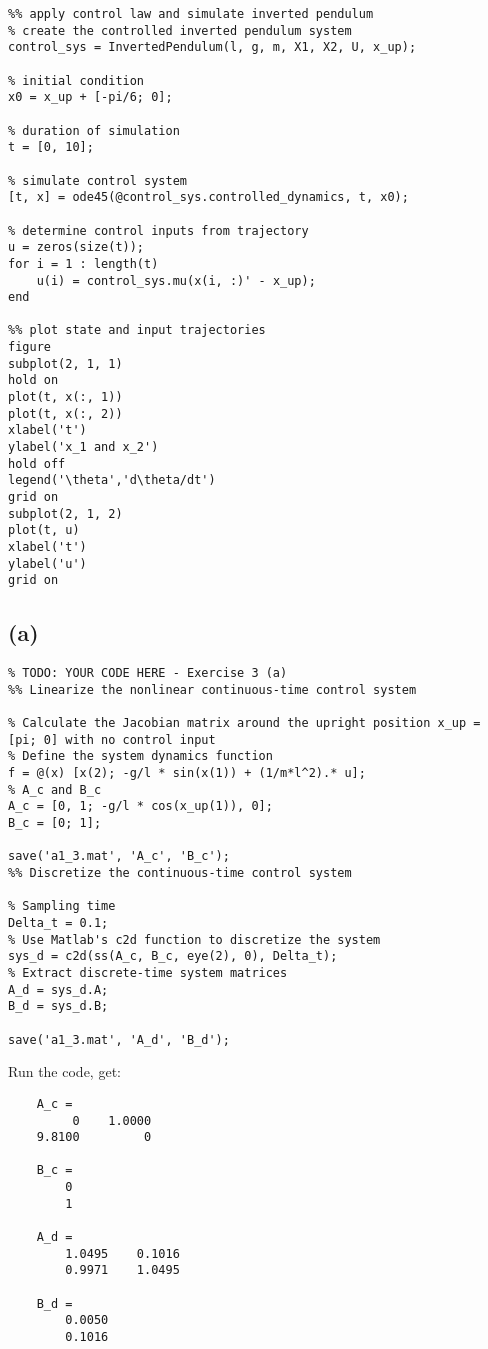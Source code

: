 \documentclass[8pt, a4paper, oneside, justified]{article}
\numberwithin{equation}{section}
\begin{document}
\begin{lstlisting}
%% apply control law and simulate inverted pendulum
% create the controlled inverted pendulum system
control_sys = InvertedPendulum(l, g, m, X1, X2, U, x_up);

% initial condition
x0 = x_up + [-pi/6; 0];

% duration of simulation
t = [0, 10];

% simulate control system
[t, x] = ode45(@control_sys.controlled_dynamics, t, x0);

% determine control inputs from trajectory
u = zeros(size(t));
for i = 1 : length(t)
    u(i) = control_sys.mu(x(i, :)' - x_up);
end

%% plot state and input trajectories
figure
subplot(2, 1, 1)
hold on
plot(t, x(:, 1))
plot(t, x(:, 2))
xlabel('t')
ylabel('x_1 and x_2')
hold off
legend('\theta','d\theta/dt')
grid on
subplot(2, 1, 2)
plot(t, u)
xlabel('t')
ylabel('u')
grid on
\end{lstlisting}

\subsection*{(a)}

\begin{lstlisting}
% TODO: YOUR CODE HERE - Exercise 3 (a)
%% Linearize the nonlinear continuous-time control system

% Calculate the Jacobian matrix around the upright position x_up = [pi; 0] with no control input
% Define the system dynamics function
f = @(x) [x(2); -g/l * sin(x(1)) + (1/m*l^2).* u];
% A_c and B_c
A_c = [0, 1; -g/l * cos(x_up(1)), 0];
B_c = [0; 1];

save('a1_3.mat', 'A_c', 'B_c');
%% Discretize the continuous-time control system

% Sampling time
Delta_t = 0.1;
% Use Matlab's c2d function to discretize the system
sys_d = c2d(ss(A_c, B_c, eye(2), 0), Delta_t);
% Extract discrete-time system matrices
A_d = sys_d.A;
B_d = sys_d.B;

save('a1_3.mat', 'A_d', 'B_d');
\end{lstlisting}

Run the code, get:
\begin{lstlisting}
    A_c =
         0    1.0000
    9.8100         0

    B_c =
        0
        1

    A_d =
        1.0495    0.1016
        0.9971    1.0495

    B_d =
        0.0050
        0.1016
\end{lstlisting}
\end{document}
